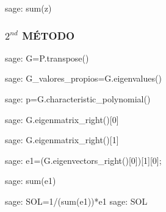     
\begin{sagecommandline}
    sage: sum(z)
\end{sagecommandline}

\newpage    
\subsubsection*{$2^{nd}$ MÉTODO}
    
\begin{sagecommandline}
    sage: G=P.transpose()
\end{sagecommandline}
    
\begin{sagecommandline}
    sage: G_valores_propios=G.eigenvalues()
\end{sagecommandline}

\begin{sagecommandline}
    sage: p=G.characteristic_polynomial()
\end{sagecommandline}

\begin{sagecommandline}
    sage: G.eigenmatrix_right()[0]
\end{sagecommandline}

\begin{sagecommandline}
    sage: G.eigenmatrix_right()[1]
\end{sagecommandline}
    
\begin{sagecommandline}
    sage: e1=(G.eigenvectors_right()[0])[1][0];
\end{sagecommandline}
    
\begin{sagecommandline}
    sage: sum(e1)
\end{sagecommandline}
    
\begin{sagecommandline}
    sage: SOL=1/(sum(e1))*e1
    sage: SOL
\end{sagecommandline}